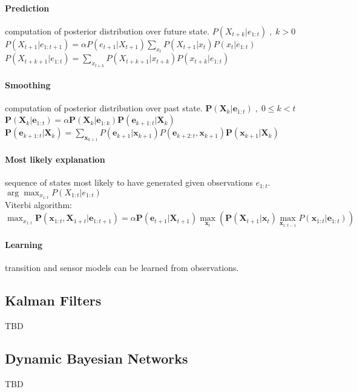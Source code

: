 \begin{multicols}{4}
\paragraph{Prediction} computation of posterior distribution over future state. $P(X_{t+k}|e_{1:t}) \; , \; k>0$ \\
$P(X_{t+1}|e_{1:t+1}) = \alpha P(e_{t+1}|X_{t+1}) \sum\limits_{x_t}P(X_{t+1}|x_t)P(x_t|e_{1:t})$ \\
$P(X_{t+k+1}|e_{1:t}) = \sum\limits_{x_{t+k}}P(X_{t+k+1}|x_{t+k})P(x_{t+k}|e_{1:t})$
\paragraph{Smoothing} computation of posterior distribution over past state. $\bm{P}(\bm{X}_k|\bm{e}_{1:t}) \; , \; 0 \leq k < t$ \\
$\bm{P}(\bm{X}_k|\bm{e}_{1:t}) = \alpha \bm{P}(\bm{X}_k|\bm{e}_{1:k})\bm{P}(\bm{e}_{k+1:t}|\bm{X}_k)$ \\
$\bm{P}(\bm{e}_{k+1:t}|\bm{X}_k) = \sum\limits_{\bm{x}_{k+1}}P(\bm{e}_{k+1}|\bm{x}_{k+1})P(\bm{e}_{k+2:t},\bm{x}_{k+1})\bm{P}(\bm{x}_{k+1}|\bm{X}_k)$
\paragraph{Most likely explanation} sequence of states most likely to have generated given observations $e_{1:t}$. $\arg\!\max_{x_{1:t}} P(X_{1:t}|e_{1:t})$ \\
Viterbi algorithm: $\max_{x_{1:t}} \bm{P}(\bm{x}_{1:t},\bm{X}_{1+t}|\bm{e}_{1:t+1}) = \alpha \bm{P}(\bm{e}_{t+1}|\bm{X}_{t+1})\max\limits_{\bm{x}_t}\left(\bm{P}(\bm{X}_{t+1}|\bm{x}_t) \max\limits_{\bm{x}_{1:t-1}} P(\bm{x}_{1:t} | \bm{e}_{1:t}) \right)$
\paragraph{Learning} transition and sensor models can be learned from observations.

\subsection{Kalman Filters}
TBD

\subsection{Dynamic Bayesian Networks}

TBD

\end{multicols}
